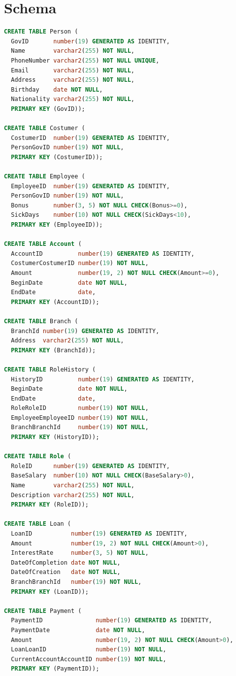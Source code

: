 \documentclass[a4paper, 10pt]{article}
\begin{document}
\section{Schema}
\begin{lstlisting}[language=SQL]
CREATE TABLE Person (
  GovID       number(19) GENERATED AS IDENTITY, 
  Name        varchar2(255) NOT NULL, 
  PhoneNumber varchar2(255) NOT NULL UNIQUE, 
  Email       varchar2(255) NOT NULL, 
  Address     varchar2(255) NOT NULL, 
  Birthday    date NOT NULL, 
  Nationality varchar2(255) NOT NULL, 
  PRIMARY KEY (GovID));

CREATE TABLE Costumer (
  CostumerID  number(19) GENERATED AS IDENTITY, 
  PersonGovID number(19) NOT NULL, 
  PRIMARY KEY (CostumerID));

CREATE TABLE Employee (
  EmployeeID  number(19) GENERATED AS IDENTITY, 
  PersonGovID number(19) NOT NULL, 
  Bonus       number(3, 5) NOT NULL CHECK(Bonus>=0), 
  SickDays    number(10) NOT NULL CHECK(SickDays<10), 
  PRIMARY KEY (EmployeeID));

CREATE TABLE Account (
  AccountID          number(19) GENERATED AS IDENTITY, 
  CostumerCostumerID number(19) NOT NULL, 
  Amount             number(19, 2) NOT NULL CHECK(Amount>=0), 
  BeginDate          date NOT NULL, 
  EndDate            date, 
  PRIMARY KEY (AccountID));

CREATE TABLE Branch (
  BranchId number(19) GENERATED AS IDENTITY, 
  Address  varchar2(255) NOT NULL, 
  PRIMARY KEY (BranchId));

CREATE TABLE RoleHistory (
  HistoryID          number(19) GENERATED AS IDENTITY, 
  BeginDate          date NOT NULL, 
  EndDate            date, 
  RoleRoleID         number(19) NOT NULL, 
  EmployeeEmployeeID number(19) NOT NULL, 
  BranchBranchId     number(19) NOT NULL, 
  PRIMARY KEY (HistoryID));

CREATE TABLE Role (
  RoleID      number(19) GENERATED AS IDENTITY, 
  BaseSalary  number(10) NOT NULL CHECK(BaseSalary>0), 
  Name        varchar2(255) NOT NULL, 
  Description varchar2(255) NOT NULL, 
  PRIMARY KEY (RoleID));

CREATE TABLE Loan (
  LoanID           number(19) GENERATED AS IDENTITY, 
  Amount           number(19, 2) NOT NULL CHECK(Amount>0), 
  InterestRate     number(3, 5) NOT NULL, 
  DateOfCompletion date NOT NULL, 
  DateOfCreation   date NOT NULL, 
  BranchBranchId   number(19) NOT NULL, 
  PRIMARY KEY (LoanID));

CREATE TABLE Payment (
  PaymentID               number(19) GENERATED AS IDENTITY, 
  PaymentDate             date NOT NULL, 
  Amount                  number(19, 2) NOT NULL CHECK(Amount>0), 
  LoanLoanID              number(19) NOT NULL, 
  CurrentAccountAccountID number(19) NOT NULL, 
  PRIMARY KEY (PaymentID));


\end{lstlisting}
\end{document}
